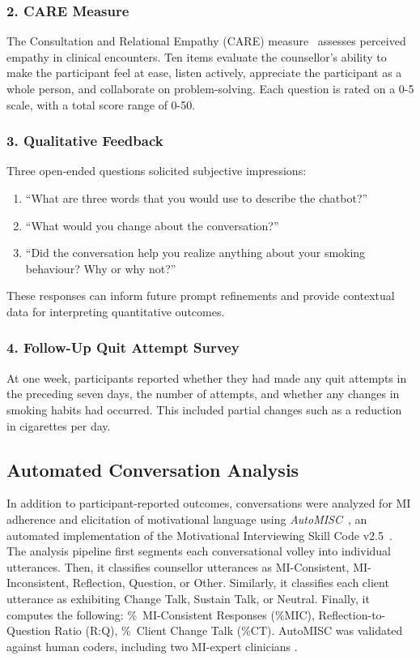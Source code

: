 \subsubsection{2. CARE Measure}
\label{subsec:care}
The Consultation and Relational Empathy (CARE) measure~\citep{mercer2004consultation,bikker2015measuring} assesses perceived empathy in clinical encounters. Ten items evaluate the counsellor's ability to make the participant feel at ease, listen actively, appreciate the participant as a whole person, and collaborate on problem-solving. Each question is rated on a 0-5 scale, with a total score range of 0-50.

\subsubsection{3. Qualitative Feedback}
Three open-ended questions solicited subjective impressions:
\begin{enumerate}
    \item ``What are three words that you would use to describe the chatbot?''
    \item ``What would you change about the conversation?''
    \item ``Did the conversation help you realize anything about your smoking behaviour? Why or why not?''
\end{enumerate}
These responses can inform future prompt refinements and provide contextual data for interpreting quantitative outcomes.

\subsubsection{4. Follow-Up Quit Attempt Survey}
At one week, participants reported whether they had made any quit attempts in the preceding seven days, the number of attempts, and whether any changes in smoking habits had occurred. This included partial changes such as a reduction in cigarettes per day.

\subsection{Automated Conversation Analysis}
\label{subsec:automisc}
In addition to participant-reported outcomes, conversations were analyzed for MI adherence and elicitation of motivational language using \textit{AutoMISC}~\cite{mahmood2025fully}, an automated implementation of the Motivational Interviewing Skill Code v2.5~\citep{Houck2010}. The analysis pipeline first segments each conversational volley into individual utterances. Then, it classifies counsellor utterances as MI-Consistent, MI-Inconsistent, Reflection, Question, or Other. Similarly, it classifies each client utterance as exhibiting Change Talk, Sustain Talk, or Neutral. Finally, it computes the following: \%~MI-Consistent Responses (\%MIC), Reflection-to-Question Ratio (R:Q), \%~Client Change Talk (\%CT). AutoMISC was validated against human coders, including two MI-expert clinicians \cite{mahmood-etal-2025-fully}.


